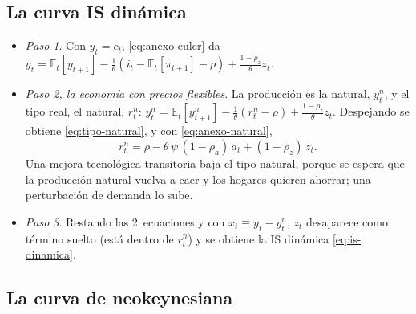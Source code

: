 \documentclass[11pt]{article}
\begin{document}
\subsection{La curva IS dinámica}\label{anexo:is}

\begin{itemize}
\item \emph{Paso 1}. Con $y_t=c_t$, \eqref{eq:anexo-euler} da $y_t=\mathbb{E}_t[y_{t+1}]-\frac1\theta(i_t-\mathbb{E}_t[\pi_{t+1}]-\rho)+\frac{1-\rho_z}{\theta}z_t$.
\item \emph{Paso 2, la economía con precios flexibles}. La producción es la natural, $y^n_t$, y el tipo real, el natural, $r^n_t$: $y^n_t=\mathbb{E}_t[y^n_{t+1}]-\frac1\theta(r^n_t-\rho)+\frac{1-\rho_z}{\theta}z_t$. Despejando se obtiene \eqref{eq:tipo-natural}, y con \eqref{eq:anexo-natural},
  $$r^n_t=\rho-\theta\,\psi\,(1-\rho_a)\,a_t+(1-\rho_z)\,z_t.$$
  Una mejora tecnológica transitoria baja el tipo natural, porque se espera que la producción natural vuelva a caer y los hogares quieren ahorrar; una perturbación de demanda lo sube.
\item \emph{Paso 3}. Restando las 2~ecuaciones y con $x_t\equiv y_t-y^n_t$, $z_t$ desaparece como término suelto (está dentro de $r^n_t$) y se obtiene la IS dinámica \eqref{eq:is-dinamica}. \findemo
\end{itemize}

\subsection{La curva de  neokeynesiana}\label{anexo:nkpc}
\end{document}
